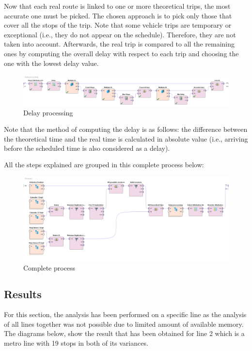 \documentclass{article}
\begin{document}
Now that each real route is linked to one or more theoretical trips, the most accurate one must be picked. The chosen approach is to pick only those that cover all the stops of the trip. Note that some vehicle trips are temporary or exceptional (i.e., they do not appear on the schedule). Therefore, they are not taken into account. Afterwards, the real trip is compared to all the remaining ones by computing the overall delay with respect to each trip and choosing the one with the lowest delay value.

 \begin{figure}[H]
    \centering
    \includegraphics[width=\textwidth]{images/Delay.png} 
    \caption{Delay processing}
\end{figure}

Note that the method of computing the delay is as follows: the difference between the theoretical time and the real time is calculated in absolute value (i.e., arriving before the scheduled time is also considered as a delay).

All the steps explained are grouped in this complete process below:

 \begin{figure}[H]
    \centering
    \includegraphics[width=\textwidth]{images/Model.png} 
    \caption{Complete process}
\end{figure}

\subsection{Results}
For this section, the analysis has been performed on a specific line as the analysis of all lines together was not possible due to limited amount of available memory. The diagrams below, show the result that has been obtained for line 2 which is a metro line with 19 stops in both of its variances.
\end{document}
